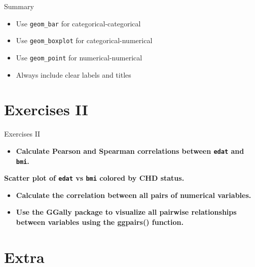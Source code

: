 \documentclass[
  ignorenonframetext,
]{beamer}
\providecommand{\tightlist}{%
  \setlength{\itemsep}{0pt}\setlength{\parskip}{0pt}}
\begin{document}
\begin{frame}[fragile]{Summary}
\begin{itemize}
\tightlist
\item
  Use \texttt{geom\_bar} for categorical-categorical
\item
  Use \texttt{geom\_boxplot} for categorical-numerical
\item
  Use \texttt{geom\_point} for numerical-numerical
\item
  Always include clear labels and titles
\end{itemize}
\end{frame}

\section{Exercises II}\label{exercises-ii}

\begin{frame}[fragile]{Exercises II}
\begin{itemize}
\tightlist
\item
  \textbf{Calculate Pearson and Spearman correlations between
  \texttt{edat} and \texttt{bmi}.}
\end{itemize}

\textbf{Scatter plot of \texttt{edat} vs \texttt{bmi} colored by CHD
status.}

\begin{itemize}
\item
  \textbf{Calculate the correlation between all pairs of numerical
  variables.}
\item
  \textbf{Use the GGally package to visualize all pairwise relationships
  between variables using the ggpairs() function.}
\end{itemize}
\end{frame}

\section{Extra}\label{extra}
\end{document}
